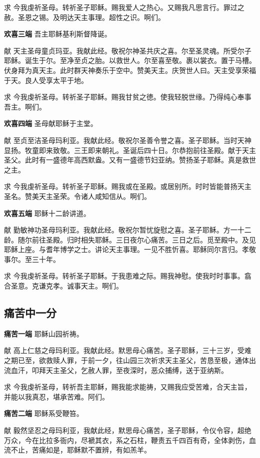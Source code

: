 \documentclass[UTF8,17pt]{ctexart}
\begin{document}
求 \quad 今我虔祈圣母。转祈圣⼦耶稣。赐我爱⼈之热⼼。又赐我凡思⾔⾏。罪过之赦。圣恩之锡。及明达天主事理。超性之识。啊们。

\textbf{欢喜三端} \quad 吾主耶稣基利斯督降诞。

献 \quad 天主圣母童贞玛亚。我献此经。敬祝尔神圣共庆之喜。尔⾄圣灵魂。所受尔⼦耶稣。诞⽣于尔。⾄净⾄贞之胎。以救世⼈。尔⾄喜⾄敬。裹以裳⾐。置于马槽。伏⾝拜为真天主。此时群天神奏乐于空中。赞美天主。庆贺世⼈曰。天主受享荣福于天。良⼈受享太平于地。

求 \quad 今我虔祈圣母。转祈圣⼦耶稣。赐我⽢贫之徳。使我轻脱世缘。乃得纯⼼奉事吾主。啊们。

\textbf{欢喜四端} \quad 圣母献耶稣于主堂。

献 \quad ⾄贞⾄洁圣母玛利亚。我献此经。敬祝尔圣善令誉之喜。圣⼦耶稣。当时天神显扬。牧童即来致敬。三王即来朝礼。圣诞后四⼗⽇。尔恭抱前往圣殿。献于天主圣⽗。此时有⼀盛德年⾼西默盎。又有⼀盛德节妇亚纳。赞扬圣⼦耶稣。真是救世之主。

求 \quad 今我虔祈圣母。转祈圣⼦耶稣。赐我或在圣殿。或居别所。时时皆能普扬天主圣名。赞美天主圣荣。令诸⼈咸知信从。啊们。

\textbf{欢喜五端} \quad 耶稣⼗⼆龄讲道。

献 \quad 勤敏神功圣母玛利亚。我献此经。敬祝尔暂忧旋慰之喜。圣⼦耶稣。⽅⼀⼗⼆龄。随尔前往圣殿。归时相失耶稣。三⽇夜尔⼼痛苦。三⽇之后。觅⾄殿中。及见耶稣上座。与耆年博学之⼠。讲论天主事理。⼀见不胜忻喜。耶稣同尔⾔归。孝敬事尔。⾄三⼗年。

求 \quad 今我虔祈圣母。转祈圣⼦耶稣。于我患难之际。赐我神慰。使我时时事事。翕合圣意。克谦克孝。诚事天主。啊们。

\subsection{痛苦中⼀分}

\textbf{痛苦⼀端} \quad 耶稣⼭园祈祷。

献 \quad ⾼上仁慈之母玛利亚。我献此经。默思母心痛苦。圣子耶稣，三十三岁，受难之期已至，欲救赎人罪，于前一夕，往山园三次祈求天主圣父，苦恳至极，通体出流血汗，叩拜天主圣父，乞赦人罪，至夜深时，恶众捕缚，送于亚纳斯。

求 \quad 今我虔祈圣母，转祈吾主耶稣，赐我能求能祷，又赐我应受苦难，合天主旨，并能以我真忍，堪承苦难。阿们。

\textbf{痛苦二端} \quad 耶稣系受鞭笞。

献 \quad 毅然坚忍之母玛利亚，我献此经，默思母心痛苦，圣子耶稣，令仪令容，超绝万众，今在比拉多衙内，尽褫其衣，系之石柱，鞭责五千四百有奇，全体剥伤，血流不止，苦痛如是，耶稣默不置辨，有如羔羊。
\end{document}
